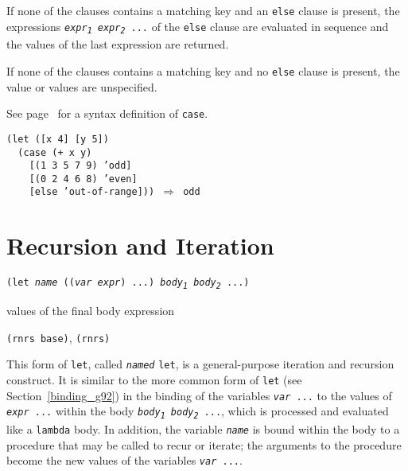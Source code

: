 If none of the clauses contains a matching key and an \texttt{else} clause
is present, the expressions \texttt{\textit{expr\textsubscript{1}} \textit{expr\textsubscript{2}} ...} of the
\texttt{else} clause are evaluated in sequence and the values of the last
expression are returned.


If none of the clauses contains a matching key and no \texttt{else} clause
is present, the value or values are unspecified.


See page \pageref{syntax_defn_case} for a syntax definition of \texttt{case}.


\begin{alltt}
(let ([x 4] [y 5])
  (case (+ x y)
    [(1 3 5 7 9) 'odd]
    [(0 2 4 6 8) 'even]
    [else 'out-of-range])) \(\Rightarrow\) odd
\end{alltt}

\section{\label{control_g100}\label{control_h4}Recursion and Iteration\label{control_SECTRECURSION}}


\begin{description}

\label{control_s20}\item[syntax] \texttt{(let \textit{name} ((\textit{var} \textit{expr}) ...) \textit{body\textsubscript{1}} \textit{body\textsubscript{2}} ...)}



\item[returns] values of the final body expression


\item[libraries] \texttt{(rnrs base)}, \texttt{(rnrs)}
\end{description}


This form of \texttt{let}, called \label{control_s21}\texttt{\textit{named}}
\texttt{let}, is a general-purpose \label{control_s22}iteration and
\label{control_s23}recursion construct.
It is similar to the more common form of \texttt{let}
(see Section \ref{binding_g92}) in the
binding of the variables \texttt{\textit{var} ...} to the values of \texttt{\textit{expr} ...} within
the body \texttt{\textit{body\textsubscript{1}} \textit{body\textsubscript{2}} ...}, which is processed and evaluated like
a \texttt{lambda} body.
In addition, the variable \texttt{\textit{name}} is bound within the body to
a procedure that may be called to recur or iterate; the arguments to
the procedure become the new values of the variables \texttt{\textit{var} ...}.


